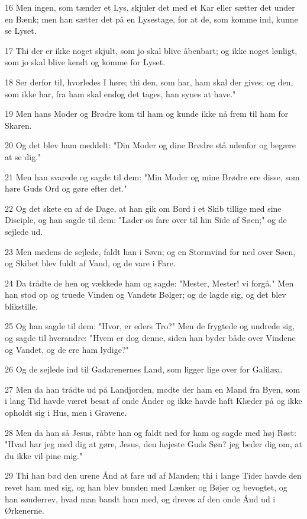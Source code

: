 \par 16 Men ingen, som tænder et Lys, skjuler det med et Kar eller sætter det under en Bænk; men han sætter det på en Lysestage, for at de, som komme ind, kunne se Lyset.
\par 17 Thi der er ikke noget skjult, som jo skal blive åbenbart; og ikke noget lønligt, som jo skal blive kendt og komme for Lyset.
\par 18 Ser derfor til, hvorledes I høre; thi den, som har, ham skal der gives; og den, som ikke har, fra ham skal endog det tages, han synes at have."
\par 19 Men hans Moder og Brødre kom til ham og kunde ikke nå frem til ham for Skaren.
\par 20 Og det blev ham meddelt: "Din Moder og dine Brødre stå udenfor og begære at se dig."
\par 21 Men han svarede og sagde til dem: "Min Moder og mine Brødre ere disse, som høre Guds Ord og gøre efter det."
\par 22 Og det skete en af de Dage, at han gik om Bord i et Skib tillige med sine Disciple, og han sagde til dem: "Lader os fare over til hin Side af Søen;" og de sejlede ud.
\par 23 Men medens de sejlede, faldt han i Søvn; og en Stormvind for ned over Søen, og Skibet blev fuldt af Vand, og de vare i Fare.
\par 24 Da trådte de hen og vækkede ham og sagde: "Mester, Mester! vi forgå." Men han stod op og truede Vinden og Vandets Bølger; og de lagde sig, og det blev blikstille.
\par 25 Og han sagde til dem: "Hvor, er eders Tro?" Men de frygtede og undrede sig, og sagde til hverandre: "Hvem er dog denne, siden han byder både over Vindene og Vandet, og de ere ham lydige?"
\par 26 Og de sejlede ind til Gadarenernes Land, som ligger lige over for Galilæa.
\par 27 Men da han trådte ud på Landjorden, mødte der ham en Mand fra Byen, som i lang Tid havde været besat af onde Ånder og ikke havde haft Klæder på og ikke opholdt sig i Hus, men i Gravene.
\par 28 Men da han så Jesus, råbte han og faldt ned for ham og sagde med høj Røst: "Hvad har jeg med dig at gøre, Jesus, den højeste Guds Søn? jeg beder dig om, at du ikke vil pine mig."
\par 29 Thi han bød den urene Ånd at fare ud af Manden; thi i lange Tider havde den revet ham med sig, og han blev bunden med Lænker og Bøjer og bevogtet, og han sønderrev, hvad man bandt ham med, og dreves af den onde Ånd ud i Ørkenerne.
